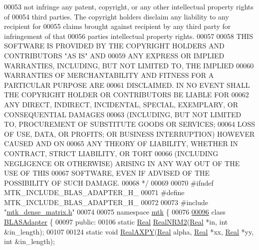 \begin{DoxyCode}
00053 \textcolor{comment}{not infringe any patent, copyright, or any other intellectual property rights of}
00054 \textcolor{comment}{third parties. The copyright holders disclaim any liability to any recipient for}
00055 \textcolor{comment}{claims brought against recipient by any third party for infringement of that}
00056 \textcolor{comment}{parties intellectual property rights.}
00057 \textcolor{comment}{}
00058 \textcolor{comment}{THIS SOFTWARE IS PROVIDED BY THE COPYRIGHT HOLDERS AND CONTRIBUTORS "AS IS" AND}
00059 \textcolor{comment}{ANY EXPRESS OR IMPLIED WARRANTIES, INCLUDING, BUT NOT LIMITED TO, THE IMPLIED}
00060 \textcolor{comment}{WARRANTIES OF MERCHANTABILITY AND FITNESS FOR A PARTICULAR PURPOSE ARE}
00061 \textcolor{comment}{DISCLAIMED. IN NO EVENT SHALL THE COPYRIGHT HOLDER OR CONTRIBUTORS BE LIABLE FOR}
00062 \textcolor{comment}{ANY DIRECT, INDIRECT, INCIDENTAL, SPECIAL, EXEMPLARY, OR CONSEQUENTIAL DAMAGES}
00063 \textcolor{comment}{(INCLUDING, BUT NOT LIMITED TO, PROCUREMENT OF SUBSTITUTE GOODS OR SERVICES;}
00064 \textcolor{comment}{LOSS OF USE, DATA, OR PROFITS; OR BUSINESS INTERRUPTION) HOWEVER CAUSED AND ON}
00065 \textcolor{comment}{ANY THEORY OF LIABILITY, WHETHER IN CONTRACT, STRICT LIABILITY, OR TORT}
00066 \textcolor{comment}{(INCLUDING NEGLIGENCE OR OTHERWISE) ARISING IN ANY WAY OUT OF THE USE OF THIS}
00067 \textcolor{comment}{SOFTWARE, EVEN IF ADVISED OF THE POSSIBILITY OF SUCH DAMAGE.}
00068 \textcolor{comment}{*/}
00069 
00070 \textcolor{preprocessor}{#ifndef MTK\_INCLUDE\_BLAS\_ADAPTER\_H\_}
00071 \textcolor{preprocessor}{#define MTK\_INCLUDE\_BLAS\_ADAPTER\_H\_}
00072 
00073 \textcolor{preprocessor}{#include "\hyperlink{mtk__dense__matrix_8h}{mtk\_dense\_matrix.h}"}
00074 
00075 \textcolor{keyword}{namespace }\hyperlink{namespacemtk}{mtk} \{
00076 
\hypertarget{mtk__blas__adapter_8h_source_l00096}{}\hyperlink{classmtk_1_1BLASAdapter}{00096} \textcolor{keyword}{class }\hyperlink{classmtk_1_1BLASAdapter}{BLASAdapter} \{
00097  \textcolor{keyword}{public}:
00106   \textcolor{keyword}{static} \hyperlink{group__c01-roots_gac080bbbf5cbb5502c9f00405f894857d}{Real} \hyperlink{classmtk_1_1BLASAdapter_ab92440888b730863244c5d9479c11aca}{RealNRM2}(\hyperlink{group__c01-roots_gac080bbbf5cbb5502c9f00405f894857d}{Real} *in, \textcolor{keywordtype}{int} &in\_length);
00107 
00124   \textcolor{keyword}{static} \textcolor{keywordtype}{void} \hyperlink{classmtk_1_1BLASAdapter_a081cd092ae65e730f44eae8643edd539}{RealAXPY}(\hyperlink{group__c01-roots_gac080bbbf5cbb5502c9f00405f894857d}{Real} alpha, \hyperlink{group__c01-roots_gac080bbbf5cbb5502c9f00405f894857d}{Real} *xx, \hyperlink{group__c01-roots_gac080bbbf5cbb5502c9f00405f894857d}{Real} *yy, \textcolor{keywordtype}{int} &in\_length);

\end{DoxyCode}
